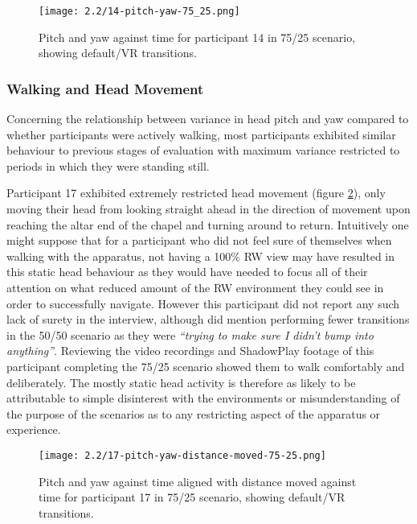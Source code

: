 \begin{figure}
	\begin{center}
	\texttt{[image: 2.2/14-pitch-yaw-75\_25.png]}
	\caption{Pitch and yaw against time for participant 14 in 75/25 scenario, showing default/VR transitions.}
	\label{14-pitch-yaw-75_25.png}
	\end{center}
\end{figure}


\subsubsection{Walking and Head Movement}

Concerning the relationship between variance in head pitch and yaw compared to whether participants were actively walking, most participants exhibited similar behaviour to previous stages of evaluation with maximum variance restricted to periods in which they were standing still.

Participant 17 exhibited extremely restricted head movement (figure \ref{17-pitch-yaw-distance-moved-75-25.png}), only moving their head from looking straight ahead in the direction of movement upon reaching the altar end of the chapel and turning around to return. Intuitively one might suppose that for a participant who did not feel sure of themselves when walking with the apparatus, not having a 100\% RW view may have resulted in this static head behaviour as they would have needed to focus all of their attention on what reduced amount of the RW environment they could see in order to successfully navigate. However this participant did not report any such lack of surety in the interview, although did mention performing fewer transitions in the 50/50 scenario as they were \textit{``trying to make sure I didn't bump into anything''}. Reviewing the video recordings and ShadowPlay footage of this participant completing the 75/25 scenario showed them to walk comfortably and deliberately. The mostly static head activity is therefore as likely to be attributable to simple disinterest with the environments or misunderstanding of the purpose of the scenarios as to any restricting aspect of the apparatus or experience.

\begin{figure}[h]
	\begin{center}
	\texttt{[image: 2.2/17-pitch-yaw-distance-moved-75-25.png]}
	\caption{Pitch and yaw against time aligned with distance moved against time for participant 17 in 75/25 scenario, showing default/VR transitions.}
	\label{17-pitch-yaw-distance-moved-75-25.png}
	\end{center}
\end{figure}

